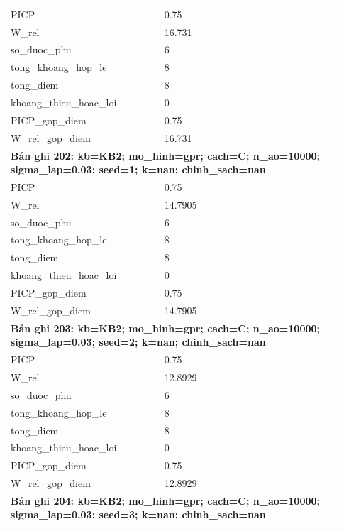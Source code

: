 \begin{longtable}{p{0.43\linewidth}p{0.50\linewidth}}
PICP & 0.75 \\
W\_\allowbreak rel & 16.731 \\
so\_\allowbreak duoc\_\allowbreak phu & 6 \\
tong\_\allowbreak khoang\_\allowbreak hop\_\allowbreak le & 8 \\
tong\_\allowbreak diem & 8 \\
khoang\_\allowbreak thieu\_\allowbreak hoac\_\allowbreak loi & 0 \\
PICP\_\allowbreak gop\_\allowbreak diem & 0.75 \\
W\_\allowbreak rel\_\allowbreak gop\_\allowbreak diem & 16.731 \\
\midrule
\multicolumn{2}{p{0.95\linewidth}}{\textbf{Bản ghi 202: kb=KB2; mo\_hinh=gpr; cach=C; n\_ao=10000; sigma\_lap=0.03; seed=1; k=nan; chinh\_sach=nan}} \\
PICP & 0.75 \\
W\_\allowbreak rel & 14.7905 \\
so\_\allowbreak duoc\_\allowbreak phu & 6 \\
tong\_\allowbreak khoang\_\allowbreak hop\_\allowbreak le & 8 \\
tong\_\allowbreak diem & 8 \\
khoang\_\allowbreak thieu\_\allowbreak hoac\_\allowbreak loi & 0 \\
PICP\_\allowbreak gop\_\allowbreak diem & 0.75 \\
W\_\allowbreak rel\_\allowbreak gop\_\allowbreak diem & 14.7905 \\
\midrule
\multicolumn{2}{p{0.95\linewidth}}{\textbf{Bản ghi 203: kb=KB2; mo\_hinh=gpr; cach=C; n\_ao=10000; sigma\_lap=0.03; seed=2; k=nan; chinh\_sach=nan}} \\
PICP & 0.75 \\
W\_\allowbreak rel & 12.8929 \\
so\_\allowbreak duoc\_\allowbreak phu & 6 \\
tong\_\allowbreak khoang\_\allowbreak hop\_\allowbreak le & 8 \\
tong\_\allowbreak diem & 8 \\
khoang\_\allowbreak thieu\_\allowbreak hoac\_\allowbreak loi & 0 \\
PICP\_\allowbreak gop\_\allowbreak diem & 0.75 \\
W\_\allowbreak rel\_\allowbreak gop\_\allowbreak diem & 12.8929 \\
\midrule
\multicolumn{2}{p{0.95\linewidth}}{\textbf{Bản ghi 204: kb=KB2; mo\_hinh=gpr; cach=C; n\_ao=10000; sigma\_lap=0.03; seed=3; k=nan; chinh\_sach=nan}} \\

\end{longtable}
